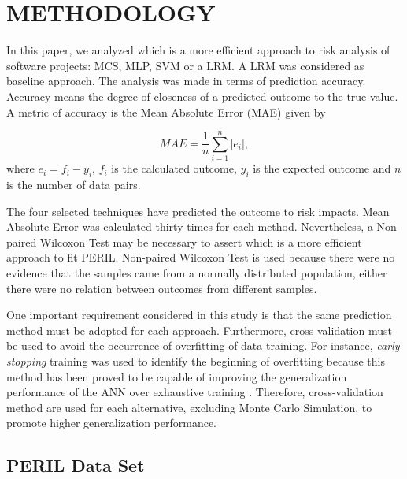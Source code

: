 \documentclass[a4paper,twoside]{article}
\begin{document}
\section{\uppercase{Methodology}}
\label{sec:methodology}

\noindent In this paper, we analyzed which is a more efficient approach to risk analysis of software projects: MCS, MLP, SVM or a LRM. A LRM was considered as baseline approach. The analysis was made in terms of prediction accuracy. Accuracy means the degree of closeness of a predicted outcome to the true value. A metric of accuracy is the Mean Absolute Error (MAE) given by

\begin{equation}\label{eq_MAE}
    MAE=\frac{1}{n}\sum_{i=1}^{n} |e_i|,
\end{equation}
where $e_i=f_i - y_i$, $f_i$ is the calculated outcome, $y_i$ is the expected outcome and $n$ is the number of data pairs.

The four selected techniques have predicted the outcome to risk impacts. Mean Absolute Error was calculated thirty times for each method. Nevertheless, a Non-paired Wilcoxon Test \cite{siegel1956nonparametric} may be necessary to assert which is a more efficient approach to fit PERIL. Non-paired Wilcoxon Test is used because there were no evidence that the samples came from a normally distributed population, either there were no relation between outcomes from different samples.

One important requirement considered in this study is that the same prediction method must be adopted for each approach. Furthermore, cross-validation \cite{amari1996statistical} must be used to avoid the occurrence of overfitting of data training. For instance, \textit{early stopping} training was used to identify the beginning of overfitting because this method has been proved to be capable of improving the generalization performance of the ANN over exhaustive training \cite{haykin1994neural} \cite{amari1996new}. Therefore, cross-validation method are used for each alternative, excluding Monte Carlo Simulation, to promote higher generalization performance.

\subsection{PERIL Data Set}
\label{sec:perildataset}
\end{document}

